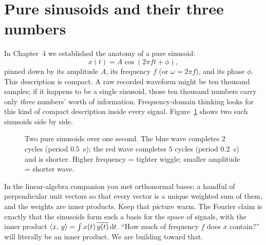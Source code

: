 \section{Pure sinusoids and their three numbers}

In Chapter~4 we established the anatomy of a pure sinusoid:
\[
  x(t) = A\cos(2\pi f t + \phi),
\]
pinned down by its amplitude $A$, its frequency $f$ (or $\omega = 2\pi f$), and its phase $\phi$.
This description is compact. A raw recorded waveform might
be ten thousand samples; if it happens to be a single sinusoid, those ten thousand numbers carry
only \emph{three} numbers' worth of information. Frequency-domain thinking looks for this kind of
compact description inside every signal. Figure~\ref{ch05:twosines} shows two such sinusoids side by side.

\begin{figure}[H]
\centering
{}
\caption{Two pure sinusoids over one second. The blue wave completes $2$ cycles
(period $0.5$~s); the red wave completes $5$ cycles (period $0.2$~s) and is
shorter. Higher frequency = tighter wiggle; smaller amplitude = shorter wave.}
\label{ch05:twosines}
\end{figure}

\begin{connectionbox}
In the linear-algebra companion you met orthonormal bases: a handful of perpendicular
unit vectors so that every vector is a unique weighted sum of them, and the weights
are inner products. Keep that picture warm. The Fourier claim is exactly that the
sinusoids form such a basis for the space of signals, with the inner product
$\langle x,\, y \rangle = \int x(t)\,\overline{y(t)}\,\mathrm{d} t$. ``How much of frequency $f$ does
$x$ contain?'' will literally be an inner product. We are building toward that.
\end{connectionbox}

